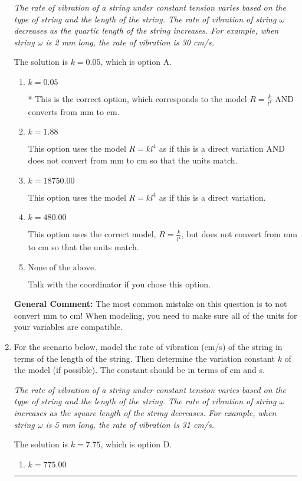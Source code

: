\documentclass{extbook}[14pt]
\newcommand{\litem}[1]{\item #1

\rule{\textwidth}{0.4pt}}
\begin{document}
\begin{enumerate}
{\begin{center}
    \textit{ The rate of vibration of a string under constant tension varies based on the type of string and the length of the string. The rate of vibration of string $\omega$ decreases as the quartic length of the string increases. For example, when string $\omega$ is 2 mm long, the rate of vibration is 30 cm/s. }
\end{center}
The solution is \( k = 0.05 \), which is option A.\begin{enumerate}[label=\Alph*.]
\item \( k = 0.05 \)

* This is the correct option, which corresponds to the model $R = \frac{k}{l^{4}}$ AND converts from mm to cm.
\item \( k = 1.88 \)

This option uses the model $R = kl^{4}$ as if this is a direct variation AND does not convert from mm to cm so that the units match.
\item \( k = 18750.00 \)

This option uses the model $R = kl^{4}$ as if this is a direct variation.
\item \( k = 480.00 \)

This option uses the correct model, $R = \frac{k}{l^{4}}$, but does not convert from mm to cm so that the units match.
\item \( \text{None of the above.} \)

Talk with the coordinator if you chose this option.
\end{enumerate}

\textbf{General Comment:} The most common mistake on this question is to not convert mm to cm! When modeling, you need to make sure all of the units for your variables are compatible.
}
\litem{
For the scenario below, model the rate of vibration (cm/s) of the string in terms of the length of the string. Then determine the variation constant $k$ of the model (if possible). The constant should be in terms of cm and s.

\begin{center}
    \textit{ The rate of vibration of a string under constant tension varies based on the type of string and the length of the string. The rate of vibration of string $\omega$ increases as the square length of the string decreases. For example, when string $\omega$ is 5 mm long, the rate of vibration is 31 cm/s. }
\end{center}
The solution is \( k = 7.75 \), which is option D.\begin{enumerate}[label=\Alph*.]
\item \( k = 775.00 \)


\end{enumerate}}
\end{enumerate}
\end{document}
